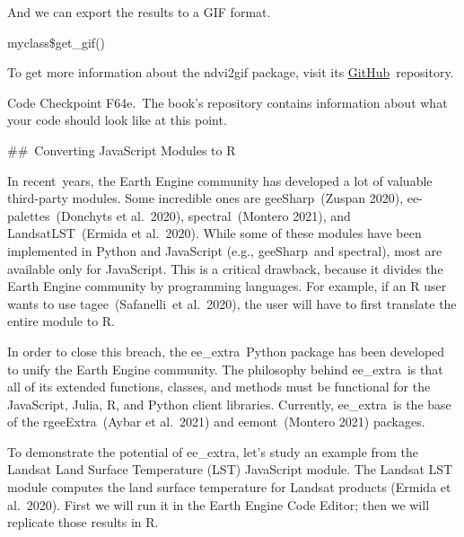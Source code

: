 \documentclass[
  letterpaper,
  DIV=11,
  numbers=noendperiod]{scrreprt}
\begin{document}
And we can export the results to a GIF format.

myclass\$get\_gif()

To get more information about the ndvi2gif package, visit its
\href{https://www.google.com/url?q=https://github.com/Digdgeo/Ndvi2Gif\&sa=D\&source=editors\&ust=1671458841429620\&usg=AOvVaw0cUiJ9wlrQB8a2-Whxs0zA}{GitHub}~repository.

\begin{tcolorbox}[enhanced jigsaw, left=2mm, breakable, rightrule=.15mm, opacityback=0, colframe=quarto-callout-note-color-frame, colbacktitle=quarto-callout-note-color!10!white, arc=.35mm, opacitybacktitle=0.6, toptitle=1mm, colback=white, leftrule=.75mm, title=\textcolor{quarto-callout-note-color}{\faInfo}\hspace{0.5em}{Note}, toprule=.15mm, bottomtitle=1mm, titlerule=0mm, bottomrule=.15mm, coltitle=black]

Code Checkpoint F64e.~The book's repository contains information about
what your code should look like at this point.

\end{tcolorbox}

\#\#~Converting JavaScript Modules to R

In recent~years, the Earth Engine community has developed a lot of
valuable third-party modules. Some incredible ones are geeSharp~(Zuspan
2020), ee-palettes~(Donchyts et al.~2020), spectral~(Montero 2021), and
LandsatLST~(Ermida et al.~2020). While some of these modules have been
implemented in Python and JavaScript (e.g., geeSharp~and spectral), most
are available only for JavaScript. This is a critical drawback, because
it divides the Earth Engine community by programming languages. For
example, if an R user wants to use tagee~(Safanelli~et al.~2020), the
user will have to first translate the entire module to R.

In order to close this breach, the ee\_extra~Python package has been
developed to unify the Earth Engine community. The philosophy behind
ee\_extra~is that all of its extended functions, classes, and methods
must be functional for the JavaScript, Julia, R, and Python client
libraries. Currently, ee\_extra~is the base of the rgeeExtra~(Aybar et
al.~2021) and eemont~(Montero 2021) packages.

To demonstrate the potential of ee\_extra, let's study an example from
the Landsat Land Surface Temperature (LST) JavaScript module. The
Landsat LST module computes the land surface temperature for Landsat
products (Ermida et al.~2020). First we will run it in the Earth Engine
Code Editor; then we will replicate those results in R.
\end{document}
